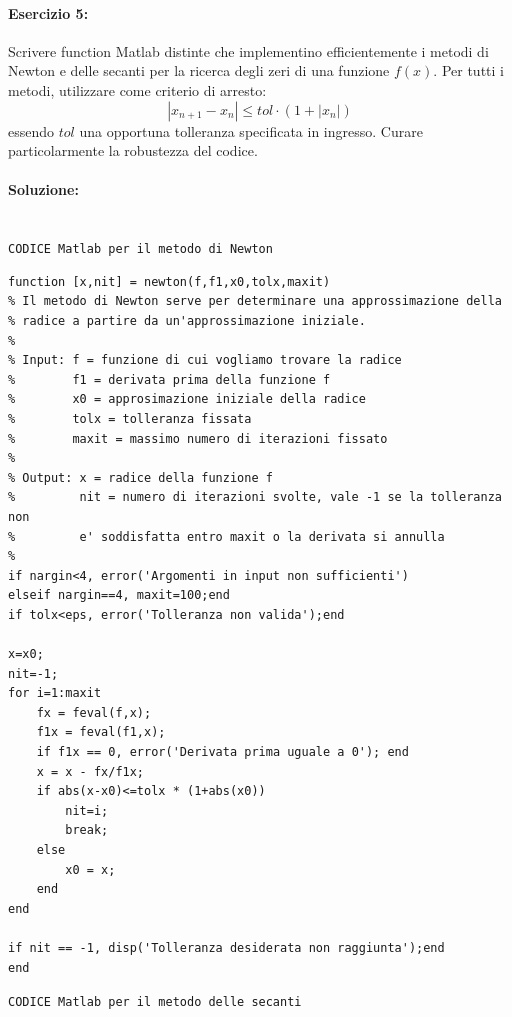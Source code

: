\documentclass[12pt]{article}
\begin{document}
\paragraph{Esercizio 5:}
Scrivere function Matlab distinte che implementino efficientemente i metodi di Newton e delle secanti per la ricerca degli zeri di una funzione \(f(x)\). 
Per tutti i metodi, utilizzare come criterio di arresto:
$$|x_{n+1} - x_n| \leq tol \cdot (1 + |x_n|)$$
essendo \(tol\) una opportuna tolleranza specificata in ingresso. Curare particolarmente la robustezza del codice.
\paragraph{Soluzione:}\mbox{}\\
\texttt{CODICE Matlab per il metodo di Newton}
\begin{lstlisting}[frame=single]
function [x,nit] = newton(f,f1,x0,tolx,maxit)
% Il metodo di Newton serve per determinare una approssimazione della
% radice a partire da un'approssimazione iniziale.
% 
% Input: f = funzione di cui vogliamo trovare la radice
%        f1 = derivata prima della funzione f
%        x0 = approsimazione iniziale della radice
%        tolx = tolleranza fissata
%        maxit = massimo numero di iterazioni fissato
%
% Output: x = radice della funzione f
%         nit = numero di iterazioni svolte, vale -1 se la tolleranza non 
%         e' soddisfatta entro maxit o la derivata si annulla
%
if nargin<4, error('Argomenti in input non sufficienti')
elseif nargin==4, maxit=100;end
if tolx<eps, error('Tolleranza non valida');end

x=x0;
nit=-1;
for i=1:maxit
    fx = feval(f,x);
    f1x = feval(f1,x);
    if f1x == 0, error('Derivata prima uguale a 0'); end
    x = x - fx/f1x;
    if abs(x-x0)<=tolx * (1+abs(x0))
        nit=i;
        break;
    else
        x0 = x;
    end
end

if nit == -1, disp('Tolleranza desiderata non raggiunta');end
end 
\end{lstlisting}
\texttt{CODICE Matlab per il metodo delle secanti}
\end{document}
